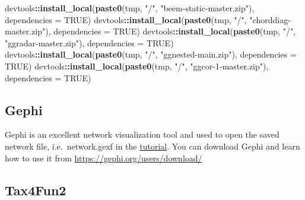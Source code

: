 \documentclass[
]{book}
\newenvironment{Shaded}{\begin{snugshade}}{\end{snugshade}}
\newcommand{\AttributeTok}[1]{\textcolor[rgb]{0.13,0.29,0.53}{#1}}
\newcommand{\ConstantTok}[1]{\textcolor[rgb]{0.56,0.35,0.01}{#1}}
\newcommand{\FunctionTok}[1]{\textcolor[rgb]{0.13,0.29,0.53}{\textbf{#1}}}
\newcommand{\NormalTok}[1]{#1}
\newcommand{\SpecialCharTok}[1]{\textcolor[rgb]{0.81,0.36,0.00}{\textbf{#1}}}
\newcommand{\StringTok}[1]{\textcolor[rgb]{0.31,0.60,0.02}{#1}}
\begin{document}
\begin{Shaded}
\begin{Highlighting}[]
\NormalTok{devtools}\SpecialCharTok{::}\FunctionTok{install\_local}\NormalTok{(}\FunctionTok{paste0}\NormalTok{(tmp, }\StringTok{"/"}\NormalTok{, }\StringTok{"beem{-}static{-}master.zip"}\NormalTok{), }\AttributeTok{dependencies =} \ConstantTok{TRUE}\NormalTok{)}
\NormalTok{devtools}\SpecialCharTok{::}\FunctionTok{install\_local}\NormalTok{(}\FunctionTok{paste0}\NormalTok{(tmp, }\StringTok{"/"}\NormalTok{, }\StringTok{"chorddiag{-}master.zip"}\NormalTok{), }\AttributeTok{dependencies =} \ConstantTok{TRUE}\NormalTok{)}
\NormalTok{devtools}\SpecialCharTok{::}\FunctionTok{install\_local}\NormalTok{(}\FunctionTok{paste0}\NormalTok{(tmp, }\StringTok{"/"}\NormalTok{, }\StringTok{"ggradar{-}master.zip"}\NormalTok{), }\AttributeTok{dependencies =} \ConstantTok{TRUE}\NormalTok{)}
\NormalTok{devtools}\SpecialCharTok{::}\FunctionTok{install\_local}\NormalTok{(}\FunctionTok{paste0}\NormalTok{(tmp, }\StringTok{"/"}\NormalTok{, }\StringTok{"ggnested{-}main.zip"}\NormalTok{), }\AttributeTok{dependencies =} \ConstantTok{TRUE}\NormalTok{)}
\NormalTok{devtools}\SpecialCharTok{::}\FunctionTok{install\_local}\NormalTok{(}\FunctionTok{paste0}\NormalTok{(tmp, }\StringTok{"/"}\NormalTok{, }\StringTok{"ggcor{-}1{-}master.zip"}\NormalTok{), }\AttributeTok{dependencies =} \ConstantTok{TRUE}\NormalTok{)}
\end{Highlighting}
\end{Shaded}

\subsection{Gephi}\label{gephi}

Gephi is an excellent network visualization tool and used to open the saved network file,
i.e.~network.gexf in the \href{https://chiliubio.github.io/microeco_tutorial/model-based-class.html\#trans_network-class}{tutorial}.
You can download Gephi and learn how to use it from \url{https://gephi.org/users/download/}

\subsection{Tax4Fun2}\label{tax4fun2}
\end{document}
